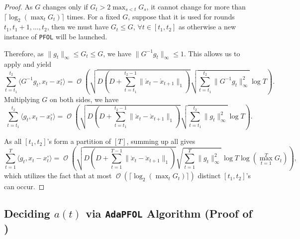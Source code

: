 \documentclass[11pt,fullpage,letterpaper]{article} %
\renewcommand{\bm}[1]{#1}%
\renewcommand{\O}{\operatorname{\mathcal O}}
\newcommand{\OLOAlg}{\texttt{AdaPFOL}\xspace}
\begin{document}
\begin{proof}
As $G$ changes only if $G_t>2\max_{s<t} G_s$, it cannot change for more than $\lceil \log_2 (\max_t G_t)\rceil$ times.
For a fixed $G$, suppose that it is used for rounds $t_1,t_1+1,\ldots,t_2$, then we must have $G_t\le G$, $\forall t\in [t_1,t_2]$ as otherwise a new instance of \texttt{PFOL} will be launched.

Therefore, as $\lVert \bm g_t\rVert_\infty\le G_t\le G$, we have $\lVert G^{-1} \bm g_t\rVert_\infty\le 1$. This allows us to apply  and yield
\begin{equation*}
\sum_{t=t_1}^{t_2} \langle G^{-1} \bm g_t,\bm x_t-\bm x_t^\circ\rangle=\O\left (\sqrt{D \left (D+\sum_{t=t_1}^{t_2-1} \lVert \mathring{\bm x}_t-\mathring{\bm x}_{t+1}\rVert_1\right )}\sqrt{\sum_{t=t_1}^{t_2} \lVert G^{-1} \bm g_t\rVert_\infty^2}\log T\right ).
\end{equation*}
Multiplying $G$ on both sides, we have
\begin{equation}\label{eq:doubling trick single phase}
\sum_{t=t_1}^{t_2} \langle \bm g_t,\bm x_t-\bm x_t^\circ\rangle=\O\left (\sqrt{D \left (D+\sum_{t=t_1}^{t_2-1} \lVert \mathring{\bm x}_t-\mathring{\bm x}_{t+1}\rVert_1\right )}\sqrt{\sum_{t=t_1}^{t_2} \lVert \bm g_t\rVert_\infty^2}\log T\right ).
\end{equation}

As all $[t_1,t_2]$'s form a partition of $[T]$, summing up all  gives
\begin{equation*}
\sum_{t=1}^T \langle \bm g_t,\bm x_t-\bm x_t^\circ\rangle=\O\left (\sqrt{D \left (D+\sum_{t=1}^{T-1} \lVert \mathring{\bm x}_t-\mathring{\bm x}_{t+1}\rVert_1\right )}\sqrt{\sum_{t=1}^T \lVert \bm g_t\rVert_\infty^2}\log T \log \left (\max_{t=1}^T G_t\right )\right ),
\end{equation*}
which utilizes the fact that at most $\O(\lceil \log_2 (\max_t G_t)\rceil)$ distinct $[t_1,t_2]$'s can occur.
\end{proof}

\subsection{Deciding $\bm a(t)$ via \OLOAlg Algorithm (Proof of )}\label{sec:multi-hop Lyapunov and Online Learning appendix}
\end{document}
